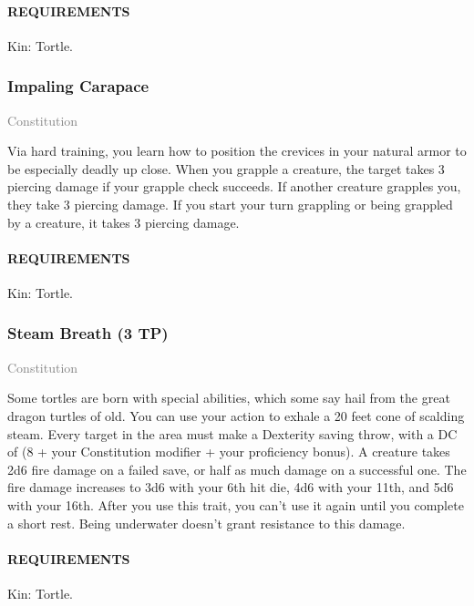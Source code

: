     \paragraph{REQUIREMENTS} Kin: Tortle.

    \subsubsection{Impaling Carapace} \label{feat::impalingcarapace}
    \small{\textcolor{gray}{Constitution}}

    \normalsize
    Via hard training, you learn how to position the crevices in your natural armor to be especially deadly up close.
    When you grapple a creature, the target takes 3 piercing damage if your grapple check succeeds.
    If another creature grapples you, they take 3 piercing damage.
    If you start your turn grappling or being grappled by a creature, it takes 3 piercing damage.
    \paragraph{REQUIREMENTS} Kin: Tortle.

    \subsubsection{Steam Breath (3 TP)} \label{feat::steambreath}
    \small{\textcolor{gray}{Constitution}}

    \normalsize
    Some tortles are born with special abilities, which some say hail from the great dragon turtles of old.
    You can use your action to exhale a 20 feet cone of scalding steam.
    Every target in the area must make a Dexterity saving throw, with a DC of (8 + your Constitution modifier + your proficiency bonus).
    A creature takes 2d6 fire damage on a failed save, or half as much damage on a successful one.
    The fire damage increases to 3d6 with your 6th hit die, 4d6 with your 11th, and 5d6 with your 16th.
    After you use this trait, you can't use it again until you complete a short rest.
    Being underwater doesn't grant resistance to this damage.

    \paragraph{REQUIREMENTS} Kin: Tortle.


